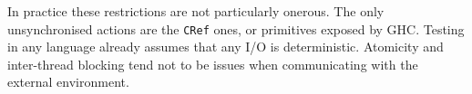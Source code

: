 In practice these restrictions are not particularly onerous. The only
unsynchronised actions are the \verb|CRef| ones, or primitives exposed
by GHC. Testing in any language already assumes that any I/O is
deterministic. Atomicity and inter-thread blocking tend not to be
issues when communicating with the external environment.
